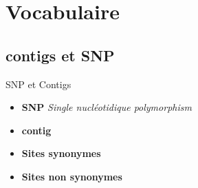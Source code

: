 %            
%
%    
%           
%
%    


\section{Vocabulaire}
\begin{frame}
	\tableofcontents[sectionstyle=show/shaded,subsectionstyle=show/show/hide,subsubsectionstyle=show/show/hide]
\end{frame}

\subsection{contigs et SNP}

\begin{frame}{SNP et Contigs}

    \begin{itemize}
        \item  \textbf{SNP} \textit{Single nucléotidique polymorphism}

        \item  \textbf{contig}
    \end{itemize}
 

    \begin{itemize}
        \item \textbf{Sites synonymes}
        \item \textbf{Sites non synonymes}
    \end{itemize}
\end{frame}

